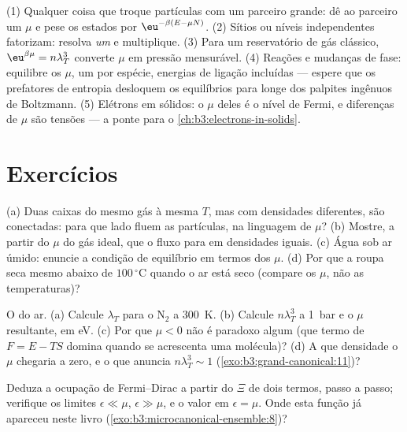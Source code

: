 \begin{method}\label{met:b3:grand-canonical:method}
(1) Qualquer coisa que troque partículas com um parceiro grande: dê ao
parceiro um $\mu$ e pese os estados por $\eu^{-\beta(E - \mu N)}$.
(2) Sítios ou níveis independentes fatorizam: resolva \emph{um} e
multiplique. (3) Para um reservatório de gás clássico, $\eu^{\beta\mu} =
n\lambda_T^3$ converte $\mu$ em pressão mensurável. (4) Reações e
mudanças de fase: equilibre os $\mu$, um por espécie, energias de
ligação incluídas --- espere que os prefatores de entropia desloquem os
equilíbrios para longe dos palpites ingênuos de Boltzmann. (5) Elétrons
em sólidos: o $\mu$ deles é o nível de Fermi, e diferenças de $\mu$ são
tensões --- a ponte para o
\cref{ch:b3:electrons-in-solids}.
\end{method}

\section{Exercícios}

\begin{exercise}[$\star$]\label{exo:b3:grand-canonical:1}
(a) Duas caixas do mesmo gás à mesma $T$, mas com densidades
diferentes, são conectadas: para que lado fluem as partículas, na
linguagem de $\mu$? (b) Mostre, a partir do $\mu$ do gás ideal, que o
fluxo para em densidades iguais. (c) Água sob ar úmido: enuncie a
condição de equilíbrio em termos dos $\mu$. (d) Por que a roupa seca
mesmo abaixo de $100\,^\circ$C quando o ar está seco (compare os $\mu$,
não as temperaturas)?
\end{exercise}

\begin{exercise}[$\star$]\label{exo:b3:grand-canonical:2}
O  do ar. (a) Calcule $\lambda_T$ para o N$_2$
a \qty{300}{K}. (b) Calcule $n\lambda_T^3$ a \qty{1}{bar} e o
$\mu$ resultante, em eV. (c) Por que $\mu < 0$ não é paradoxo algum
(que termo de $F = E - TS$ domina quando se acrescenta uma molécula)? (d)
A que densidade o $\mu$ chegaria a zero, e o que anuncia
$n\lambda_T^3 \sim 1$
(\cref{exo:b3:grand-canonical:11})?
\end{exercise}

\begin{exercise}[$\star$]\label{exo:b3:grand-canonical:3}
Deduza a ocupação de Fermi--Dirac a partir do $\Xi$ de dois termos,
passo a passo; verifique os limites $\epsilon \ll \mu$, $\epsilon \gg
\mu$, e o valor em $\epsilon = \mu$. Onde esta função já apareceu
neste livro
(\cref{exo:b3:microcanonical-ensemble:8})?
\end{exercise}

